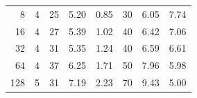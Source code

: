 \begin{table}[h!]
\begin{tabular}{rrrrrrrr}
8                      & 4                          & 25                     & 5.20                                                                              & 0.85                                                                            & 30                                                                                  & 6.05                                                                             & 7.74                                                                           \\
16                     & 4                          & 27                     & 5.39                                                                              & 1.02                                                                            & 40                                                                                  & 6.42                                                                             & 7.06                                                                           \\
32                     & 4                          & 31                     & 5.35                                                                              & 1.24                                                                            & 40                                                                                  & 6.59                                                                             & 6.61                                                                           \\
64                     & 4                          & 37                     & 6.25                                                                              & 1.71                                                                            & 50                                                                                  & 7.96                                                                             & 5.98                                                                           \\
128                    & 5                          & 31                     & 7.19                                                                              & 2.23                                                                            & 70                                                                                  & 9.43                                                                             & 5.00                                                                          
\end{tabular}
\end{table}


